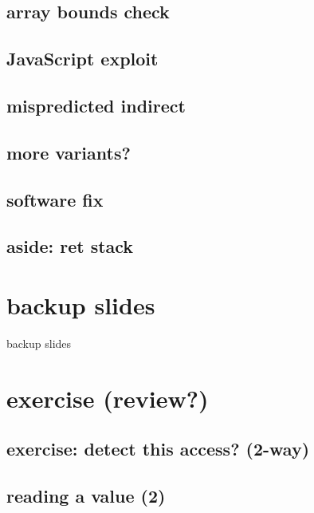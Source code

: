 \subsection{array bounds check}


\subsection{JavaScript exploit}


\subsection{mispredicted indirect}


\subsection{more variants?}


\subsection{software fix}


\subsection{aside: ret stack}



\section{backup slides}
\begin{frame}{backup slides}
\end{frame}

\section{exercise (review?)}
\subsection{exercise: detect this access? (2-way)}


\subsection{reading a value (2)}




